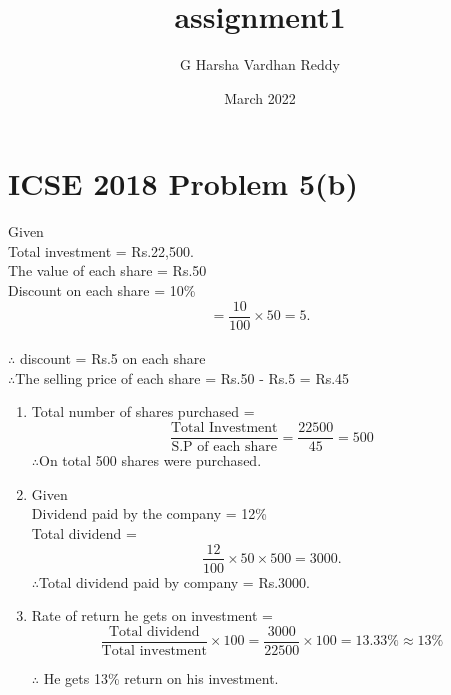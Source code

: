 \documentclass{article}
\title{assignment1}
\author{G Harsha Vardhan Reddy}
\date{March 2022}
\begin{document}
\maketitle
\section*{ICSE 2018 Problem 5(b)}

Given\\
Total investment = Rs.22,500.\\
The value of each share = Rs.50\\
Discount on each share = 10\%  \[=\frac{10}{100}\times50 = 5.\]\\
$ \therefore$ discount = Rs.5 on each share\\
$\therefore$The selling price of each share = Rs.50 - Rs.5 = Rs.45
\begin{enumerate}
    \item 
    Total number of shares purchased =\[\frac{\text{Total Investment}}{\text{S.P of each share}} = \frac{22500}{45} = 500\]
    $\therefore$On total 500 shares were purchased.
    \item
    Given\\
    Dividend paid by the company = 12\%\\
   Total dividend = \[\frac{12}{100} \times 50 \times 500 = 3000.\]
    $\therefore$Total dividend paid by company = Rs.3000.
    \item
    Rate of return he gets on investment = \[\frac{\text{Total dividend}}{\text{Total investment}} \times 100 = \frac{3000}{22500}\times 100 = 13.33\% \approx 13\%\]
    
    $\therefore$ He gets 13\% return on his investment.
\end{enumerate}

\end{document}
